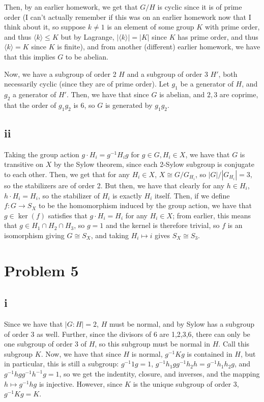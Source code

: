 \documentclass[12pt,letterpaper]{article}
\theoremstyle{definition}
\begin{document}
Then, by an earlier homework, we get that $G/H$ is cyclic since it is of prime order (I can't actually remember if this was on an earlier homework now that I think about it, so suppose $k \neq 1$ is an element of some group $K$ with prime order, and thus $\langle k \rangle \leq K$ but by Lagrange, $|\langle k \rangle| = |K|$ since $K$ has prime order, and thus $\langle k \rangle = K$ since $K$ is finite), and from another (different) earlier homework, we have that this implies $G$ to be abelian.

Now, we have a subgroup of order 2 $H$ and a subgroup of order 3 $H'$, both necessarily cyclic (since they are of prime order). Let $g_{1}$ be a generator of $H$, and $g_{2}$ a generator of $H'$. Then, we have that since $G$ is abelian, and $2, 3$ are coprime, that the order of $g_{1}g_{2}$ is $6$, so $G$ is generated by $g_{1}g_{2}$.

\subsection*{ii}

Taking the group action $g \cdot H_{i} = g^{-1}H_{i}g$ for $g \in G, H_{i} \in X$, we have that $G$ is transitive on $X$ by the Sylow theorem, since each 2-Sylow subgroup is conjugate to each other. Then, we get that for any $H_{i} \in X$, $X \cong G/G_{H_{i}}$, so $|G|/|G_{H_{i}}| = 3$, so the stabilizers are of order 2. But then, we have that clearly for any $h \in H_{i}$, $h \cdot H_{i} = H_{i}$, so the stabilizer of $H_{i}$ is exactly $H_{i}$ itself. Then, if we define $f: G \rightarrow S_{X}$ to be the homomorphism induced by the group action, we have that $g \in \ker(f)$ satisfies that $g \cdot H_{i} = H_{i}$ for any $H_{i} \in X$; from earlier, this means that $g \in H_{1} \cap H_{2} \cap H_{3}$, so $g = 1$ and the kernel is therefore trivial, so $f$ is an isomorphism giving $G \cong S_{X}$, and taking $H_{i} \mapsto i$ gives $S_{X} \cong S_{3}$.

\section*{Problem 5}
\subsection*{i}

Since we have that $|G:H| = 2$, $H$ must be normal, and by Sylow has a subgroup of order 3 as well. Further, since the divisors of 6 are 1,2,3,6, there can only be one subgroup of order 3 of $H$, so this subgroup must be normal in $H$. Call this subgroup $K$. Now, we have that since $H$ is normal, $g^{-1}Kg$ is contained in $H$, but in particular, this is still a subgroup: $g^{-1}1g = 1$, $g^{-1}h_{1}gg^{-1}h_{2}h = g^{-1}h_{1}h_{2}g$, and $g^{-1}hgg^{-1}h^{-1}g = 1$, so we get the indentity, closure, and inverses, and the mapping $h \mapsto g^{-1}hg$ is injective. However, since $K$ is the unique subgroup of order 3, $g^{-1}Kg = K$.
\end{document}
